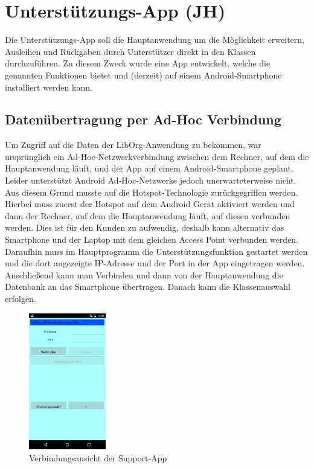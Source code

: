 \section{Unterstützungs-App (JH)}
Die Unterstützungs-App soll die Hauptanwendung um die Möglichkeit erweitern, Ausleihen und Rückgaben durch Unterstützer direkt in den Klassen durchzuführen. Zu diesem Zweck wurde eine App entwickelt, welche die genannten Funktionen bietet und (derzeit) auf einem Android-Smartphone installiert werden kann.
\subsection{Datenübertragung per Ad-Hoc Verbindung}
Um Zugriff auf die Daten der LibOrg-Anwendung zu bekommen, war ursprünglich ein Ad-Hoc-Netzwerkverbindung zwischen dem Rechner, auf dem die Hauptanwendung läuft, und der App auf einem Android-Smartphone geplant. Leider unterstützt Android Ad-Hoc-Netzwerke jedoch unerwarteterweise nicht. Aus diesem Grund musste auf die Hotspot-Technologie zurückgegriffen werden. Hierbei muss zuerst der Hotspot auf dem Android Gerät aktiviert werden und dann der Rechner, auf dem die Hauptanwendung läuft, auf diesen verbunden werden. Dies ist für den Kunden zu aufwendig, deshalb kann alternativ das Smartphone und der Laptop mit dem gleichen Access Point verbunden werden. Daraufhin muss im Hauptprogramm die Unterstützungsfunktion gestartet werden und die dort angezeigte IP-Adresse und der Port in der App eingetragen werden. Anschließend kann man Verbinden und dann von der Hauptanwendung die Datenbank an das Smartphone übertragen. Danach kann die Klassenauswahl erfolgen.
\begin{figure}[H]
	\centering
		\includegraphics[width=0.30\textwidth]{figures/SupportApp/Verbindung.png}
	\caption{Verbindungsansicht der Support-App}
	\label{fig:Verbindungsansicht App}
\end{figure}

